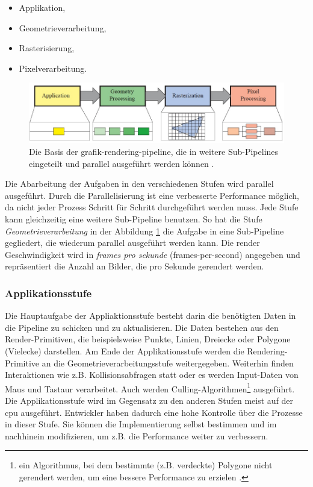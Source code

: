 \begin{itemize}
    \item Applikation,
    \item Geometrieverarbeitung,
    \item Rasterisierung,
    \item Pixelverarbeitung.
  \end{itemize}

\begin{figure}[H]
    \centering
    \includegraphics[width=\textwidth]{img/Render/render_pipeline_2.jpg}
    \caption{Die Basis der \acrshort{grafik-rendering-pipeline}, die in weitere Sub-Pipelines eingeteilt und parallel ausgeführt werden können \cite*{moeller2019}.}
    \label{fig:renderpipeline2}
\end{figure}

Die Abarbeitung der Aufgaben in den verschiedenen Stufen wird parallel ausgeführt. Durch die Parallelisierung ist eine verbesserte Performance möglich, da nicht jeder Prozess Schritt für Schritt durchgeführt werden muss. Jede Stufe kann gleichzeitig eine weitere Sub-Pipeline benutzen. So hat die Stufe \textit{Geometrieverarbeitung} in der Abbildung \ref*{fig:renderpipeline2} die Aufgabe in eine Sub-Pipeline gegliedert, die wiederum parallel ausgeführt werden kann. Die render Geschwindigkeit wird in \textit{frames pro sekunde} (\acrshort{frames-per-second}) angegeben und repräsentiert die Anzahl an Bilder, die pro Sekunde gerendert werden\cite*[Moeller (2019)]{moeller2019}. 

\subsubsection{Applikationsstufe}
Die Hauptaufgabe der Appliaktionsstufe besteht darin die benötigten Daten in die Pipeline zu schicken und zu aktualisieren. Die Daten bestehen aus den Render-Primitiven, die beispielsweise Punkte, Linien, Dreiecke oder Polygone (Vielecke) darstellen. Am Ende der Applikationsstufe werden die Rendering-Primitive an die Geometrieverarbeitungsstufe weitergegeben. Weiterhin finden Interaktionen wie z.B. Kollisionsabfragen statt oder es werden Input-Daten von Maus und Tastaur verarbeitet. Auch werden Culling-Algorithmen\footnote{ein Algorithmus, bei dem bestimmte (z.B. verdeckte) Polygone nicht gerendert werden, um eine bessere Performance zu erzielen \cite*{coorg1997}.} ausgeführt. Die Applikationsstufe wird im Gegensatz zu den anderen Stufen meist auf der \acrshort{cpu} ausgeführt. Entwickler haben dadurch eine hohe Kontrolle über die Prozesse in dieser Stufe. Sie können die Implementierung selbst bestimmen und im nachhinein modifizieren, um z.B. die Performance weiter zu verbessern\cite*[Moeller (2019)]{moeller2019}.

